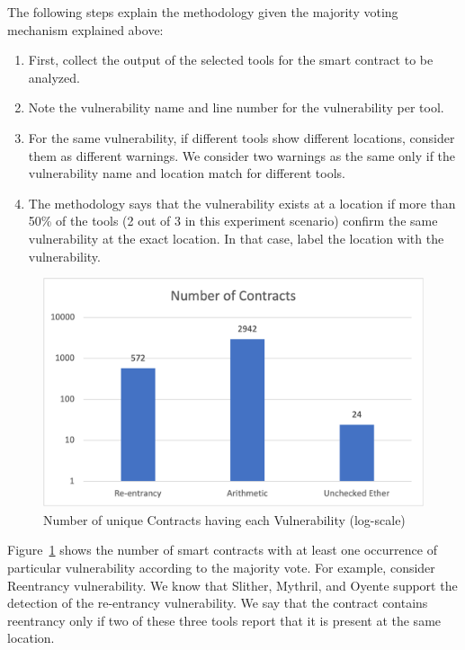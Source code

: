 	The following steps explain the methodology given the majority voting mechanism explained above:
	
	\begin{enumerate}
	
	\item First, collect the output of the selected tools for the smart contract to be analyzed.
	
	\item Note the vulnerability name and line number for the vulnerability per tool. 
	
	\item For the same vulnerability, if different tools show different locations, consider them as different warnings. We consider two warnings as the same only if the vulnerability name and location match for different tools.
	
	\item The methodology says that the vulnerability exists at a location if more than 50\% of the tools (2 out of 3 in this experiment scenario) confirm the same vulnerability at the exact location. In that case, label the location with the vulnerability.
	
	\end{enumerate}
	
	\begin{figure}[t]
		\centering
		\includegraphics[width=1\textwidth]{figures/Picture1.png}
		\caption{Number of unique Contracts having each Vulnerability (log-scale)}
		\label{fig:chart_vuln_count}
	\end{figure}
		
		Figure~\ref{fig:chart_vuln_count} shows the number of smart contracts with at least one occurrence of particular vulnerability according to the majority vote.
		For example, consider Reentrancy vulnerability. We know that Slither, Mythril, and Oyente support the detection of the re-entrancy vulnerability.
		We say that the contract contains reentrancy only if two of these three tools report that it is present at the same location.


